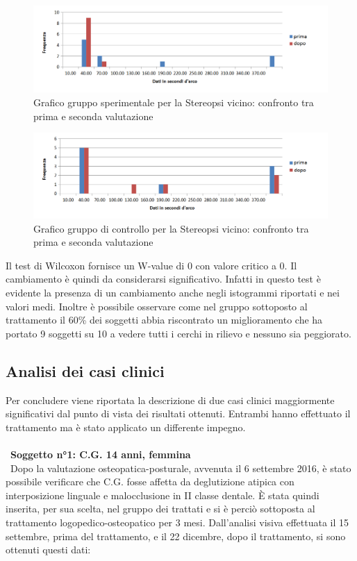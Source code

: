  \begin{figure}[h!]
	\centering
	\includegraphics[scale=0.8]{source/grafici/STEREOPSI_VICINO_TRATTATI.png}
	\caption[figure]{Grafico gruppo sperimentale per la Stereopsi vicino: confronto tra prima e seconda valutazione}
	\label{fig:issuexample}
\end{figure}
 \begin{figure}[h!]
	\centering
	\includegraphics[scale=0.8]{source/grafici/STEREOPSI_VICINO_NON_TRATTATI.png}
	\caption[figure]{Grafico gruppo di controllo per la Stereopsi vicino: confronto tra prima e seconda valutazione}
	\label{fig:issuexample}
\end{figure}

Il test di Wilcoxon fornisce un W-value di 0 con valore critico a 0. Il cambiamento è quindi da considerarsi significativo. Infatti in questo test è evidente la presenza di un cambiamento anche negli istogrammi riportati e nei valori medi. Inoltre è possibile osservare come nel gruppo sottoposto al trattamento il 60\% dei soggetti abbia riscontrato un miglioramento che ha portato 9 soggetti su 10 a vedere tutti i cerchi in rilievo e nessuno sia peggiorato. 



\subsection{Analisi dei casi clinici}

Per concludere viene riportata la descrizione di due casi clinici maggiormente significativi dal punto di vista dei risultati ottenuti. Entrambi hanno effettuato il trattamento ma è stato applicato un differente impegno.
\\\ \\\
\textbf{Soggetto n°1: C.G. 14 anni, femmina}
\\\
Dopo la valutazione osteopatica-posturale, avvenuta il 6 settembre 2016, è stato possibile verificare che C.G. fosse affetta da deglutizione atipica con interposizione linguale e malocclusione in II classe dentale. È stata quindi inserita, per sua scelta, nel gruppo dei trattati e si è perciò sottoposta al trattamento logopedico-osteopatico per 3 mesi. Dall’analisi visiva effettuata il 15 settembre, prima del trattamento, e il 22 dicembre, dopo il trattamento, si sono ottenuti questi dati:

